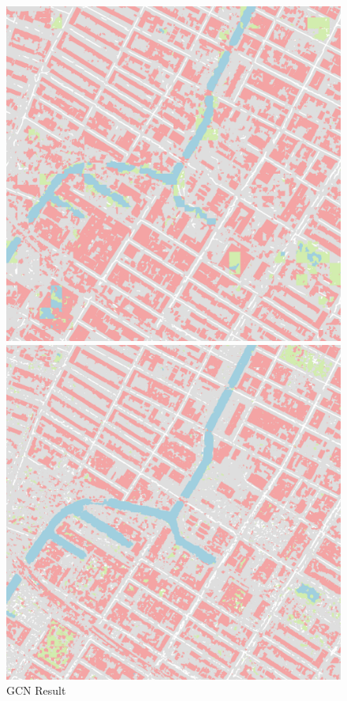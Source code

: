\documentclass[]{IEEEtran}
\begin{document}
\begin{figure}[!hbt]
	\begin{center}
		\vspace{-0.5cm}
		\begin{minipage}[t]{0.21\textwidth}
			\includegraphics[width=\columnwidth]{gcn_out}
			\caption{GCN Result}
			\label{fig:gcn}
		\end{minipage}
		\hspace{0.5cm}
		\begin{minipage}[t]{0.21\textwidth}
			\includegraphics[width=\columnwidth]{refine_out}

\end{minipage}
\end{center}
\end{figure}
\end{document}

